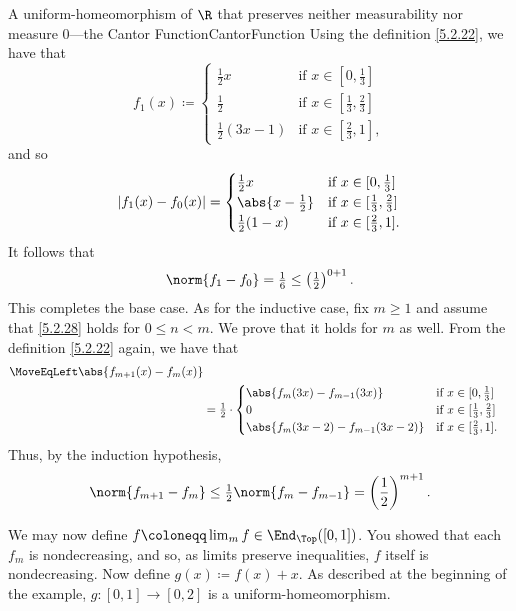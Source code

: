 \begin{exm}{A uniform-homeomorphism of $\R$ that preserves neither measurability nor measure $0$---the Cantor Function}{CantorFunction}
Using the definition \eqref{5.2.22}, we have that
\begin{equation}
f_1(x)\coloneqq \begin{cases}\tfrac{1}{2}x & \text{if }x\in [0,\tfrac{1}{3}] \\ \tfrac{1}{2} & \text{if }x\in [\tfrac{1}{3},\tfrac{2}{3}] \\ \tfrac{1}{2}(3x-1) & \text{if }x\in [\tfrac{2}{3},1],\end{cases}
\end{equation}
and so
\begin{equation}
\left| f_1(x)-f_0(x)\right| =\begin{cases}\tfrac{1}{2}x & \text{if }x\in [0,\tfrac{1}{3}] \\ \abs{x-\tfrac{1}{2}} & \text{if }x\in [\tfrac{1}{3},\tfrac{2}{3}] \\ \tfrac{1}{2}(1-x) & \text{if }x\in [\tfrac{2}{3},1].\end{cases}
\end{equation}
It follows that
\begin{equation}
\norm{f_1-f_0}=\tfrac{1}{6}\leq \left( \tfrac{1}{2}\right) ^{0+1}.
\end{equation}
This completes the base case.  As for the inductive case, fix $m\geq 1$ and assume that \eqref{5.2.28} holds for $0\leq n<m$.  We prove that it holds for $m$ as well.  From the definition \eqref{5.2.22} again, we have that
{\small
\begin{equation*}
\begin{split}
\MoveEqLeft
\abs{f_{m+1}(x)-f_m(x)} \\
& =\tfrac{1}{2}\cdot \begin{cases}\abs{f_m(3x)-f_{m-1}(3x)} & \text{if }x\in [0,\tfrac{1}{3}] \\ 0 & \text{if }x\in [\tfrac{1}{3},\tfrac{2}{3}] \\ \abs{f_m(3x-2)-f_{m-1}(3x-2)} & \text{if }x\in [\tfrac{2}{3},1].\end{cases}
\end{split}
\end{equation*}
}
Thus, by the induction hypothesis,
\begin{equation}
\norm{f_{m+1}-f_m}\leq \tfrac{1}{2}\norm{f_m-f_{m-1}}=\left( \frac{1}{2}\right) ^{m+1}.
\end{equation}

We may now define $f\coloneqq \lim _mf\in \End _{\Top}([0,1])$.  You showed that each $f_m$ is nondecreasing, and so, as limits preserve inequalities, $f$ itself is nondecreasing.  Now define $g(x)\coloneqq f(x)+x$.  As described at the beginning of the example, $g\colon [0,1]\rightarrow [0,2]$ is a uniform-homeomorphism.


\end{exm}

